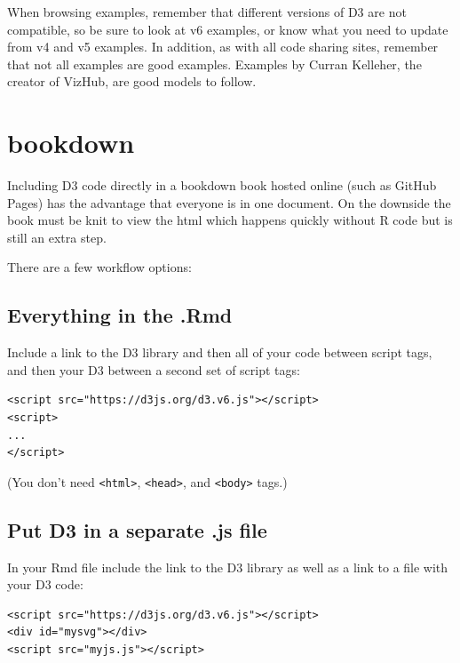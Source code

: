 \documentclass[
  openany]{book}
\begin{document}
When browsing examples, remember that different versions of D3 are not compatible, so be sure to look at v6 examples, or know what you need to update from v4 and v5 examples. In addition, as with all code sharing sites, remember that not all examples are good examples. Examples by Curran Kelleher, the creator of VizHub, are good models to follow.

\hypertarget{bookdown}{%
\section{bookdown}\label{bookdown}}

Including D3 code directly in a bookdown book hosted online (such as GitHub Pages) has the advantage that everyone is in one document. On the downside the book must be knit to view the html which happens quickly without R code but is still an extra step.

There are a few workflow options:

\hypertarget{everything-in-the-.rmd}{%
\subsection{Everything in the .Rmd}\label{everything-in-the-.rmd}}

Include a link to the D3 library and then all of your code between script tags, and then your D3 between a second set of script tags:

\begin{verbatim}
<script src="https://d3js.org/d3.v6.js"></script>
<script>
...
</script>
\end{verbatim}

(You don't need \texttt{\textless{}html\textgreater{}}, \texttt{\textless{}head\textgreater{}}, and \texttt{\textless{}body\textgreater{}} tags.)

\hypertarget{put-d3-in-a-separate-.js-file}{%
\subsection{Put D3 in a separate .js file}\label{put-d3-in-a-separate-.js-file}}

In your Rmd file include the link to the D3 library as well as a link to a file with your D3 code:

\begin{verbatim}
<script src="https://d3js.org/d3.v6.js"></script>
<div id="mysvg"></div>
<script src="myjs.js"></script>
\end{verbatim}
\end{document}
